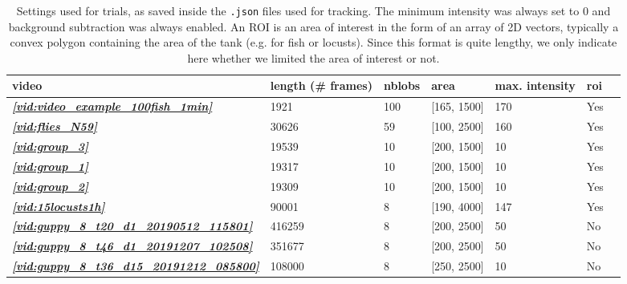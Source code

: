 \documentclass[9pt,lineno]{elife}
\newcommand{\figref}[1]{\textit{\textbf{\ref{#1}}}}
\newcommand{\vidref}[1]{\textit{\textbf{\ref{#1}}}}
\newcommand{\idtracker}{\protect\path{ idtracker.ai}}
\begin{document}
\begin{table}[t]
\caption{\label{tab:settings_idtracker} Settings used for \idtracker{} trials, as saved inside the \texttt{.json} files used for tracking. The minimum intensity was always set to 0 and background subtraction was always enabled. An ROI is an area of interest in the form of an array of 2D vectors, typically a convex polygon containing the area of the tank (e.g. for fish or locusts). Since this format is quite lengthy, we only indicate here whether we limited the area of interest or not.}
\begin{tabular}{l | l l l l l l}
\toprule
video & length (\# frames)  & nblobs & area & max. intensity & roi \\
\midrule
\vidref{vid:video_example_100fish_1min} & 1921 & 100 & [165, 1500] & 170 & Yes \\
\vidref{vid:flies_N59} & 30626 & 59 & [100, 2500] & 160 & Yes \\
\vidref{vid:group_3} & 19539 & 10 & [200, 1500] & 10 & Yes \\
\vidref{vid:group_1} & 19317 & 10 & [200, 1500] & 10 & Yes \\
\vidref{vid:group_2} & 19309 & 10 & [200, 1500] & 10 & Yes \\
\vidref{vid:15locusts1h} & 90001 & 8 & [190, 4000] & 147 & Yes \\
\vidref{vid:guppy_8_t20_d1_20190512_115801} & 416259 & 8 & [200, 2500] & 50 & No \\
\vidref{vid:guppy_8_t46_d1_20191207_102508} & 351677 & 8 & [200, 2500] & 50 & No \\
\vidref{vid:guppy_8_t36_d15_20191212_085800} & 108000 & 8 & [250, 2500] & 10 & No \\
\bottomrule
\end{tabular}
\end{table}

\end{document}
